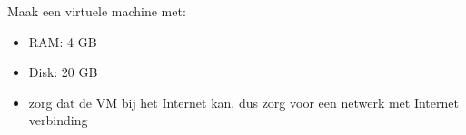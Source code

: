 Maak een virtuele machine met:
\begin{itemize}
\item RAM: 4 GB
\item Disk: 20 GB
\item zorg dat de VM bij het Internet kan, dus zorg voor een netwerk met Internet verbinding
\end{itemize}

